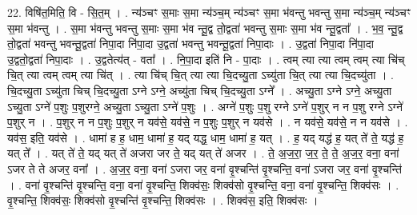 \documentclass[17pt]{extarticle}
\begin{document}
22. विषि॑त॒मिति॒ वि - सि॒त॒म् । . न्य॑ञ्चꣳ स॒माः स॒मा न्य॑ञ्च॒म् न्य॑ञ्चꣳ स॒मा भ॑वन्तु भवन्तु स॒मा न्य॑ञ्च॒म् न्य॑ञ्चꣳ स॒मा भ॑वन्तु । . स॒मा भ॑वन्तु भवन्तु स॒माः स॒मा भ॑व न्तू॒द्व तो॒द्वता॑ भवन्तु स॒माः स॒मा भ॑व न्तू॒द्वता᳚ । . भ॒व॒ न्तू॒द्व तो॒द्वता॑ भवन्तु भवन्तू॒द्वता॑ निपा॒दा नि॑पा॒दा उ॒द्वता॑ भवन्तु भवन्तू॒द्वता॑ निपा॒दाः । . उ॒द्वता॑ निपा॒दा नि॑पा॒दा उ॒द्वतो॒द्वता॑ निपा॒दाः । . उ॒द्वतेत्य॑त् - वता᳚ । . नि॒पा॒दा इति॑ नि - पा॒दाः । . त्वम् त्या त्या त्वम् त्वम् त्या चि॑च् चि॒त् त्या त्वम् त्वम् त्या चि॑त् । . त्या चि॑च् चि॒त् त्या त्या चि॒दच्यु॒ता ऽच्यु॑ता चि॒त् त्या त्या चि॒दच्यु॑ता । . चि॒दच्यु॒ता ऽच्यु॑ता चिच् चि॒दच्यु॒ता ऽग्ने ऽग्ने॒ अच्यु॑ता चिच् चि॒दच्यु॒ता ऽग्ने᳚ । . अच्यु॒ता ऽग्ने ऽग्ने॒ अच्यु॒ता ऽच्यु॒ता ऽग्ने॑ प॒शुः प॒शुरग्ने॒ अच्यु॒ता ऽच्यु॒ता ऽग्ने॑ प॒शुः । . अग्ने॑ प॒शुः प॒शु रग्ने ऽग्ने॑ प॒शुर् न न प॒शु रग्ने ऽग्ने॑ प॒शुर् न । . प॒शुर् न न प॒शुः प॒शुर् न यव॑से॒ यव॑से॒ न प॒शुः प॒शुर् न यव॑से । . न यव॑से॒ यव॑से॒ न न यव॑से । . यव॑स॒ इति॒ यव॑से । . धामा॑ ह ह॒ धाम॒ धामा॑ ह॒ यद् यद्ध॒ धाम॒ धामा॑ ह॒ यत् । . ह॒ यद् यद्ध॑ ह॒ यत् ते॑ ते॒ यद्ध॑ ह॒ यत् ते᳚ । . यत् ते॑ ते॒ यद् यत् ते॑ अजरा जर ते॒ यद् यत् ते॑ अजर । . ते॒ अ॒ज॒रा॒ ज॒र॒ ते॒ ते॒ अ॒ज॒र॒ वना॒ वना॑ ऽजर ते ते अजर॒ वना᳚ । . अ॒ज॒र॒ वना॒ वना॑ ऽजरा जर॒ वना॑ वृ॒श्चन्ति॑ वृ॒श्चन्ति॒ वना॑ ऽजरा जर॒ वना॑ वृ॒श्चन्ति॑ । . वना॑ वृ॒श्चन्ति॑ वृ॒श्चन्ति॒ वना॒ वना॑ वृ॒श्चन्ति॒ शिक्व॑सः॒ शिक्व॑सो वृ॒श्चन्ति॒ वना॒ वना॑ वृ॒श्चन्ति॒ शिक्व॑सः । . वृ॒श्चन्ति॒ शिक्व॑सः॒ शिक्व॑सो वृ॒श्चन्ति॑ वृ॒श्चन्ति॒ शिक्व॑सः । . शिक्व॑स॒ इति॒ शिक्व॑सः । \newline
\end{document}
